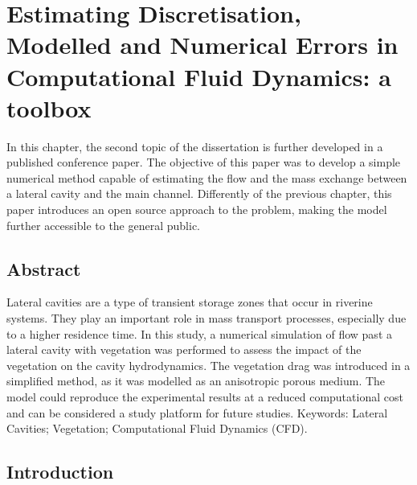 \chapter{Estimating Discretisation, Modelled and Numerical Errors in Computational Fluid Dynamics: a toolbox}
\label{chap:art5}
In this chapter, the second topic of the dissertation is further developed in a published conference paper. The objective of this paper was to develop a simple numerical method capable of estimating the flow and the mass exchange between a lateral cavity and the main channel. Differently of the previous chapter, this paper introduces an open source approach to the problem, making the model further accessible to the general public.

\section*{Abstract}
Lateral cavities are a type of transient storage zones that occur in riverine systems. They play an important role in mass transport processes, especially due to a higher residence time. In this study, a numerical simulation of flow past a lateral cavity with vegetation was performed to assess the impact of the vegetation on the cavity hydrodynamics. The vegetation drag was introduced in a simplified method, as it was modelled as an anisotropic porous medium. The model could reproduce the experimental results at a reduced computational cost and can be considered a study platform for future studies.
Keywords: Lateral Cavities; Vegetation; Computational Fluid Dynamics (CFD).

\section{Introduction}

\printbibliography[segment=\therefsegment,heading=subbibliography, title={References}]